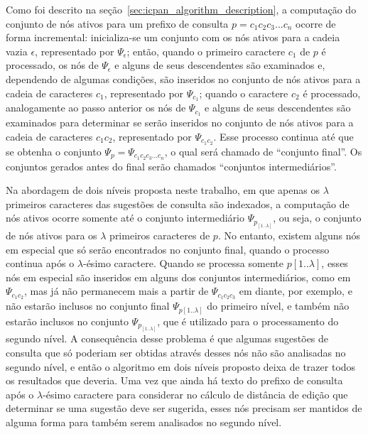 Como foi descrito na seção~\ref{sec:icpan_algorithm_description}, a computação do conjunto de nós ativos para um prefixo de consulta $p = c_{1}c_{2}c_{3}...c_{n}$ ocorre de forma incremental: inicializa-se um conjunto com os nós ativos para a cadeia vazia $\epsilon$, representado por $\Psi_{\epsilon}$; então, quando o primeiro caractere $c_{1}$ de $p$ é processado, os nós de $\Psi_{\epsilon}$ e alguns de seus descendentes são examinados e, dependendo de algumas condições, são inseridos no conjunto de nós ativos para a cadeia de caracteres $c_{1}$, representado por $\Psi_{c_{1}}$; quando o caractere $c_{2}$ é processado, analogamente ao passo anterior os nós de $\Psi_{c_{1}}$ e alguns de seus descendentes são examinados para determinar se serão inseridos no conjunto de nós ativos para a cadeia de caracteres $c_{1}c_{2}$, representado por $\Psi_{c_{1}c_{2}}$. Esse processo continua até que se obtenha o conjunto $\Psi_{p} = \Psi_{c_{1}c_{2}c_{3}...c_{n}}$, o qual será chamado de ``conjunto final''. Os conjuntos gerados antes do final serão chamados ``conjuntos intermediários''.

Na abordagem de dois níveis proposta neste trabalho, em que apenas os $\lambda$ primeiros caracteres das sugestões de consulta são indexados, a computação de nós ativos ocorre somente até o conjunto intermediário $\Psi_{p_[1..\lambda]}$, ou seja, o conjunto de nós ativos para os $\lambda$ primeiros caracteres de $p$. No entanto, existem alguns nós em especial que só serão encontrados no conjunto final, quando o processo continua após o $\lambda$-ésimo caractere. Quando se processa somente $p[1..\lambda]$, esses nós em especial são inseridos em alguns dos conjuntos intermediários, como em $\Psi_{c_1c_2}$, mas já não permanecem mais a partir de $\Psi_{c_1c_2c_3}$ em diante, por exemplo, e não estarão inclusos no conjunto final $\Psi_{p[1..\lambda]}$ do primeiro nível, e também não estarão inclusos no conjunto $\Psi_{p_[1..\lambda]}$, que é utilizado para o processamento do segundo nível. A consequência desse problema é que algumas sugestões de consulta que só poderiam ser obtidas através desses nós não são analisadas no segundo nível, e então o algoritmo em dois níveis proposto deixa de trazer todos os resultados que deveria. Uma vez que ainda há texto do prefixo de consulta após o $\lambda$-ésimo caractere para considerar no cálculo de distância de edição que determinar se uma sugestão deve ser sugerida, esses nós precisam ser mantidos de alguma forma para também serem analisados no segundo nível.


